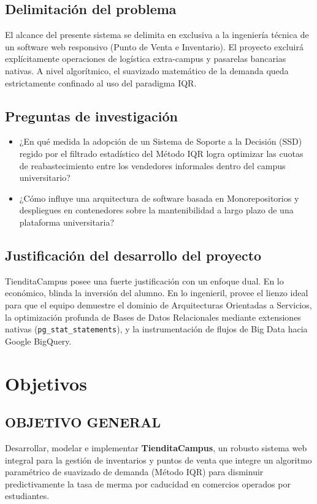 \documentclass[12pt, a4paper]{article}
\begin{document}
\subsection{Delimitación del problema}
El alcance del presente sistema se delimita en exclusiva a la ingeniería técnica de un software web responsivo (Punto de Venta e Inventario). El proyecto excluirá explícitamente operaciones de logística extra-campus y pasarelas bancarias nativas. A nivel algorítmico, el suavizado matemático de la demanda queda estrictamente confinado al uso del paradigma IQR.

\subsection{Preguntas de investigación}
\begin{itemize}
    \item ¿En qué medida la adopción de un Sistema de Soporte a la Decisión (SSD) regido por el filtrado estadístico del Método IQR logra optimizar las cuotas de reabastecimiento entre los vendedores informales dentro del campus universitario?
    \item ¿Cómo influye una arquitectura de software basada en Monorepositorios y despliegues en contenedores sobre la mantenibilidad a largo plazo de una plataforma universitaria?
\end{itemize}

\subsection{Justificación del desarrollo del proyecto}
TienditaCampus posee una fuerte justificación con un enfoque dual. En lo económico, blinda la inversión del alumno. En lo ingenieril, provee el lienzo ideal para que el equipo demuestre el dominio de Arquitecturas Orientadas a Servicios, la optimización profunda de Bases de Datos Relacionales mediante extensiones nativas (\texttt{pg\_stat\_statements}), y la instrumentación de flujos de Big Data hacia Google BigQuery.

\section{Objetivos}

\subsection{OBJETIVO GENERAL}
Desarrollar, modelar e implementar \textbf{TienditaCampus}, un robusto sistema web integral para la gestión de inventarios y puntos de venta que integre un algoritmo paramétrico de suavizado de demanda (Método IQR) para disminuir predictivamente la tasa de merma por caducidad en comercios operados por estudiantes.
\end{document}
